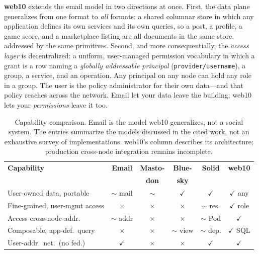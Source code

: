 \documentclass[sigconf, nonacm]{acmart}
\begin{document}
\textbf{web10} extends the email model in two directions at once. First, the
data plane generalizes from one format to \emph{all} formats: a shared
columnar store in which any application defines its own services and its own
queries, so a post, a profile, a game score, and a marketplace listing are all
documents in the same store, addressed by the same primitives. Second, and
more consequentially, the \emph{access layer} is decentralized: a uniform,
user-managed permission vocabulary in which a grant is a row naming a
\emph{globally addressable principal} (\texttt{provider/username}), a group,
a service, and an operation. Any principal on any node can hold any role in a
group. The user is the policy administrator for their own data---and that
policy reaches across the network. Email let your data leave the building;
web10 lets your \emph{permissions} leave it too.

\begin{table}[t]
\caption{Capability comparison. Email is the model web10 generalizes, not a
social system. The entries summarize the models discussed in the cited work,
not an exhaustive survey of implementations. web10's column describes its
architecture; production cross-node integration remains incomplete.}
\label{tab:capabilities}
\centering
\scriptsize
\setlength{\tabcolsep}{5pt}
\begin{tabular}{@{}p{3.6cm}ccccc@{}}
\toprule
\textbf{Capability} & \textbf{Email} & \textbf{Masto-} & \textbf{Blue-} & \textbf{Solid} & \textbf{web10} \\
 & & \textbf{don} & \textbf{sky} & & \\
\midrule
User-owned data, portable & $\sim$ mail & $\sim$ & $\checkmark$ & $\checkmark$ & $\checkmark$ any \\
Fine-grained, user-mgmt access & $\times$ & $\times$ & $\times$ & $\sim$ res. & $\checkmark$ role \\
Access cross-node-addr. & $\sim$ addr & $\times$ & $\times$ & $\sim$ Pod & $\checkmark$ \\
Composable, app-def.\ query & $\times$ & $\times$ & $\sim$ view & $\sim$ dep. & $\checkmark$ SQL \\
User-addr.\ net.\ (no fed.) & $\checkmark$ & $\times$ & $\times$ & $\checkmark$ & $\checkmark$ \\
\bottomrule
\end{tabular}
\end{table}
\end{document}

